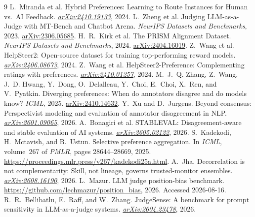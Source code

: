\documentclass{article}
\begin{document}

\begin{thebibliography}{9}
\small
{} L.~Miranda et al.
\newblock Hybrid Preferences: Learning to Route Instances for Human vs.\ AI Feedback.
\newblock \href{https://arxiv.org/abs/2410.19133}{\emph{arXiv:2410.19133}}, 2024.
 L.~Zheng et al.
\newblock Judging LLM-as-a-Judge with MT-Bench and Chatbot Arena.
\newblock \emph{NeurIPS Datasets and Benchmarks}, 2023.
\newblock \href{https://arxiv.org/abs/2306.05685}{arXiv:2306.05685}.
 H.~R.~Kirk et al.
\newblock The PRISM Alignment Dataset.
\newblock \emph{NeurIPS Datasets and Benchmarks}, 2024.
\newblock \href{https://arxiv.org/abs/2404.16019}{arXiv:2404.16019}.
 Z.~Wang et al.
\newblock HelpSteer2: Open-source dataset for training top-performing reward models.
\newblock \href{https://arxiv.org/abs/2406.08673}{\emph{arXiv:2406.08673}}, 2024.
 Z.~Wang et al.
\newblock HelpSteer2-Preference: Complementing ratings with preferences.
\newblock \href{https://arxiv.org/abs/2410.01257}{\emph{arXiv:2410.01257}}, 2024.
 M.~J.~Q. Zhang, Z.~Wang, J.~D. Hwang,
Y.~Dong, O.~Delalleau, Y.~Choi, E.~Choi, X.~Ren, and V.~Pyatkin.
\newblock Diverging preferences: When do annotators disagree and do models know?
\newblock \emph{ICML}, 2025.
\newblock \href{https://arxiv.org/abs/2410.14632}{arXiv:2410.14632}.
 Y.~Xu and D.~Jurgens.
\newblock Beyond consensus: Perspectivist modeling and evaluation of annotator disagreement in NLP.
\newblock \href{https://arxiv.org/abs/2601.09065}{\emph{arXiv:2601.09065}}, 2026.
 A.~Bonagiri et al.
\newblock STABLEVAL: Disagreement-aware and stable evaluation of AI systems.
\newblock \href{https://arxiv.org/abs/2605.02122}{\emph{arXiv:2605.02122}}, 2026.
 S.~Kadekodi, H.~Mctavish, and B.~Ustun.
\newblock Selective preference aggregation.
\newblock In \emph{ICML}, volume~267 of \emph{PMLR}, pages 28644--28669, 2025.
  \url{https://proceedings.mlr.press/v267/kadekodi25a.html}.
 A.~Jha.
\newblock Decorrelation is not complementarity: Skill, not lineage, governs
  trusted-monitor ensembles.
\newblock \href{https://arxiv.org/abs/2608.16190}{\emph{arXiv:2608.16190}}, 2026.
 L.~Mazur.
\newblock LLM judge position-bias benchmark.
\newblock \url{https://github.com/lechmazur/position_bias}, 2026. Accessed 2026-08-16.
 R.~R.~Bellibatlu, E.~Raff, and W.~Zhang.
\newblock JudgeSense: A benchmark for prompt sensitivity in LLM-as-a-judge systems.
\newblock \href{https://arxiv.org/abs/2604.23478}{\emph{arXiv:2604.23478}}, 2026.
\end{thebibliography}
\end{document}

